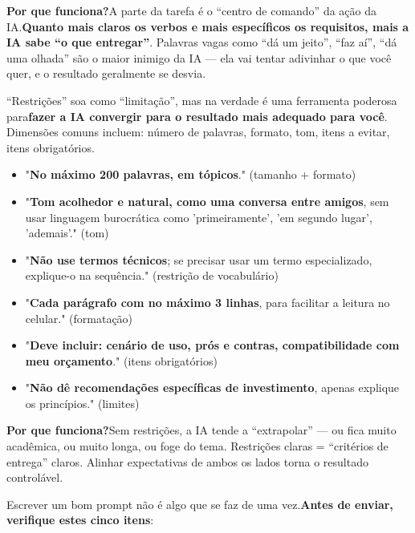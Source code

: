 \textbf{Por que funciona?}A parte da tarefa é o “centro de comando” da ação da IA.\textbf{Quanto mais claros os verbos e mais específicos os requisitos, mais a IA sabe “o que entregar”}. Palavras vagas como “dá um jeito”, “faz aí”, “dá uma olhada” são o maior inimigo da IA — ela vai tentar adivinhar o que você quer, e o resultado geralmente se desvia.


“Restrições” soa como “limitação”, mas na verdade é uma ferramenta poderosa para\textbf{fazer a IA convergir para o resultado mais adequado para você}. Dimensões comuns incluem: número de palavras, formato, tom, itens a evitar, itens obrigatórios.


\begin{itemize}
  \item "\textbf{No máximo 200 palavras, em tópicos}." (tamanho + formato)
  \item "\textbf{Tom acolhedor e natural, como uma conversa entre amigos}, sem usar linguagem burocrática como 'primeiramente', 'em segundo lugar', 'ademais'." (tom)
  \item "\textbf{Não use termos técnicos}; se precisar usar um termo especializado, explique-o na sequência." (restrição de vocabulário)
  \item "\textbf{Cada parágrafo com no máximo 3 linhas}, para facilitar a leitura no celular." (formatação)
  \item "\textbf{Deve incluir: cenário de uso, prós e contras, compatibilidade com meu orçamento}." (itens obrigatórios)
  \item "\textbf{Não dê recomendações específicas de investimento}, apenas explique os princípios." (limites)
\end{itemize}

\textbf{Por que funciona?}Sem restrições, a IA tende a “extrapolar” — ou fica muito acadêmica, ou muito longa, ou foge do tema. Restrições claras = “critérios de entrega” claros. Alinhar expectativas de ambos os lados torna o resultado controlável.


Escrever um bom prompt não é algo que se faz de uma vez.\textbf{Antes de enviar, verifique estes cinco itens}:

